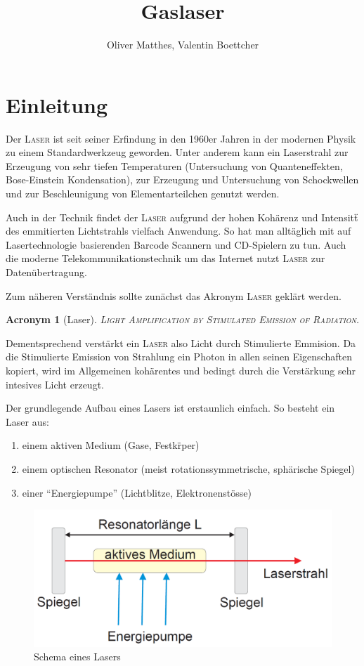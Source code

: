 \documentclass[slug=GL, room=HZDR\ Dresden/Rossendorf\,\ Geb.\ 620/123, supervisor=Tim\ Ziegler]{../../Lab_Report_LaTeX/lab_report}
\title{Gaslaser}
\author{Oliver Matthes, Valentin Boettcher}
\newcommand{\laser}{\textsc{Laser}}
\newtheorem{acro}{Acronym}[section]
\begin{document}
\maketitle

\section{Einleitung}%
\label{sec:intro}
Der \laser{} ist seit seiner Erfindung in den 1960er Jahren in der
modernen Physik zu einem Standardwerkzeug geworden. Unter anderem
kann ein Laserstrahl zur Erzeugung von sehr tiefen Temperaturen
(Untersuchung von Quanteneffekten, Bose-Einstein Kondensation), zur
Erzeugung und Untersuchung von Schockwellen und zur Beschleunigung von
Elementarteilchen genutzt werden.

 Auch in der Technik findet der \laser{} aufgrund
der hohen Koh\"arenz und Intensit\"t des emmitierten Lichtstrahls
vielfach Anwendung. So hat man allt\"aglich mit auf Lasertechnologie
basierenden Barcode Scannern und CD-Spielern zu tun. Auch die moderne
Telekommunikationstechnik um das Internet nutzt \laser{} zur
Daten\"ubertragung.

Zum n\"aheren Verst\"andnis sollte zun\"achst das Akronym \laser{}
gekl\"art werden.

\begin{acro}[Laser]
\textsc{Light Amplification by Stimulated Emission of Radiation.}
\end{acro}

Dementsprechend verst\"arkt ein \laser{} also Licht durch Stimulierte
Emmision. Da die Stimulierte Emission von Strahlung ein Photon in
allen seinen Eigenschaften kopiert, wird im Allgemeinen koh\"arentes
und bedingt durch die Verst\"arkung sehr intesives Licht erzeugt.

Der grundlegende Aufbau eines Lasers ist erstaunlich einfach. So
besteht ein Laser aus:

\begin{enumerate}
\item einem aktiven Medium (Gase, Festk\"rper)
\item einem optischen Resonator (meist rotationssymmetrische, sph\"arische Spiegel)
\item einer ``Energiepumpe'' (Lichtblitze, Elektronenst\"osse)
\end{enumerate}

\begin{figure}[H]\centering
  \includegraphics[width=.5\columnwidth]{schema.png}
  \caption[Aufbau]{Schema eines Lasers}
  \label{fig:aufb}
\end{figure}
\end{document}

